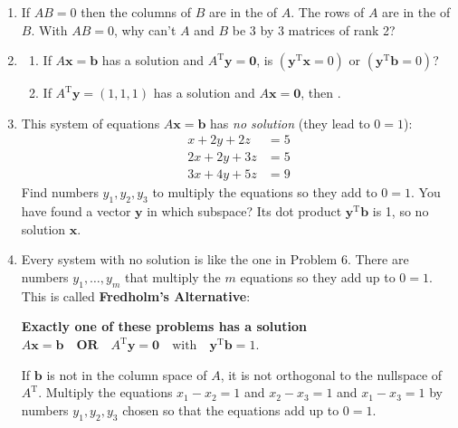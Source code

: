 \documentclass[14pt, a4paper]{article}
\begin{document}
\begin{enumerate}
    \item If $AB = 0$ then the columns of $B$ are in the \underline{\hspace{2cm}} of $A$. The rows of $A$ are in the \underline{\hspace{2cm}} of $B$. With $AB = 0$, why can't $A$ and $B$ be 3 by 3 matrices of rank 2?

    \item
          \begin{enumerate}
              \item If $A\boldsymbol{x} = \boldsymbol{b}$ has a solution and $A^{\mathrm{T}}\boldsymbol{y} = \boldsymbol{0}$, is $(\boldsymbol{y}^{\mathrm{T}}\boldsymbol{x} = 0)$ or $(\boldsymbol{y}^{\mathrm{T}}\boldsymbol{b} = 0)$?
              \item If $A^{\mathrm{T}}\boldsymbol{y} = (1, 1, 1)$ has a solution and $A\boldsymbol{x} = \boldsymbol{0}$, then \underline{\hspace{2cm}}.
          \end{enumerate}

    \item This system of equations $A\boldsymbol{x} = \boldsymbol{b}$ has \emph{no solution} (they lead to $0 = 1$):
          \begin{align*}
              x + 2y + 2z  & = 5 \\
              2x + 2y + 3z & = 5 \\
              3x + 4y + 5z & = 9
          \end{align*}
          Find numbers $y_1, y_2, y_3$ to multiply the equations so they add to $0 = 1$. You have found a vector $\boldsymbol{y}$ in which subspace? Its dot product $\boldsymbol{y}^{\mathrm{T}}\boldsymbol{b}$ is 1, so no solution $\boldsymbol{x}$.

    \item Every system with no solution is like the one in Problem 6. There are numbers $y_1, \dots, y_m$ that multiply the $m$ equations so they add up to $0 = 1$. This is called \textbf{Fredholm's Alternative}:
          \begin{center}
              \textbf{Exactly one of these problems has a solution} \\
              $A\boldsymbol{x} = \boldsymbol{b} \quad \textbf{OR} \quad A^{\mathrm{T}}\boldsymbol{y} = \boldsymbol{0} \quad \text{with} \quad \boldsymbol{y}^{\mathrm{T}}\boldsymbol{b} = 1$.
          \end{center}
          If $\boldsymbol{b}$ is not in the column space of $A$, it is not orthogonal to the nullspace of $A^{\mathrm{T}}$. Multiply the equations $x_1 - x_2 = 1$ and $x_2 - x_3 = 1$ and $x_1 - x_3 = 1$ by numbers $y_1, y_2, y_3$ chosen so that the equations add up to $0 = 1$.


\end{enumerate}
\end{document}
